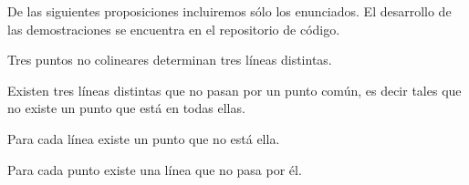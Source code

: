 
De las siguientes proposiciones incluiremos sólo los enunciados. El desarrollo
de las demostraciones se encuentra en el repositorio de código.


\begin{prop}
	Tres puntos no colineares determinan tres líneas distintas.
\end{prop}



\begin{prop}
	Existen tres líneas distintas que no pasan por un punto común, es decir
	tales que no existe un punto que está en todas ellas.
\end{prop}


\begin{prop}
	Para cada línea existe un punto que no está ella.
\end{prop}


\begin{prop}
	Para cada punto existe una línea que no pasa por él.
\end{prop}











